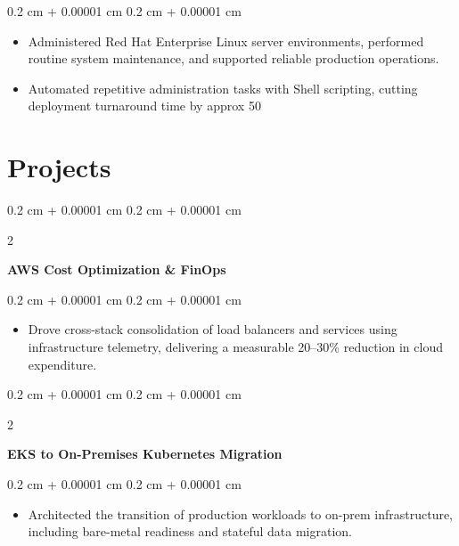 \documentclass[10pt, letterpaper]{article}
\newenvironment{highlights}{
    \begin{itemize}[
        topsep=0.10 cm,
        parsep=0.10 cm,
        partopsep=0pt,
        itemsep=0pt,
        leftmargin=0.4 cm + 10pt
    ]
}{
    \end{itemize}
} %
\newenvironment{onecolentry}{
    \begin{adjustwidth}{
        0.2 cm + 0.00001 cm
    }{
        0.2 cm + 0.00001 cm
    }
}{
    \end{adjustwidth}
} %
\newenvironment{twocolentry}[2][]{
    \onecolentry
    \def\secondColumn{#2}
    \setcolumnwidth{\fill, 4.5 cm}
    \begin{paracol}{2}
}{
    \switchcolumn \raggedleft \secondColumn
    \end{paracol}
    \endonecolentry
} %
\begin{document}
        \vspace{0.10 cm}
        \begin{onecolentry}
            \begin{highlights}
                \item Administered Red Hat Enterprise Linux server environments, performed routine system maintenance, and supported reliable production operations.
                \item Automated repetitive administration tasks with Shell scripting, cutting deployment turnaround time by approx 50%
            \end{highlights}
        \end{onecolentry}
    
    \section{Projects}
        \begin{twocolentry}{}    
            \textbf{AWS Cost Optimization \& FinOps}
        \end{twocolentry}
        \vspace{0.10 cm}
        \begin{onecolentry}
            \begin{highlights}
                \item Drove cross-stack consolidation of load balancers and services using infrastructure telemetry, delivering a measurable 20–30\% reduction in cloud expenditure.
            \end{highlights}
        \end{onecolentry}

        \vspace{0.2 cm}

        \begin{twocolentry}{}
            \textbf{EKS to On-Premises Kubernetes Migration}
        \end{twocolentry}
        \vspace{0.10 cm}
        \begin{onecolentry}
            \begin{highlights}
            \item Architected the transition of production workloads to on-prem infrastructure, including bare-metal readiness and stateful data migration.
            \end{highlights}
        \end{onecolentry}
\end{document}
